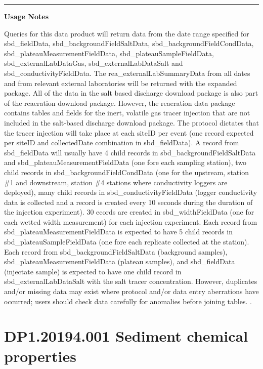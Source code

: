 \documentclass[]{article}
\begin{document}
\begin{center}\rule{0.5\linewidth}{\linethickness}\end{center}

\textbf{Usage Notes}

Queries for this data product will return data from the date range
specified for sbd\_fieldData, sbd\_backgroundFieldSaltData,
sbd\_backgroundFieldCondData, sbd\_plateauMeasurementFieldData,
sbd\_plateauSampleFieldData, sbd\_externalLabDataGas,
sbd\_externalLabDataSalt and sbd\_conductivityFieldData. The
rea\_externalLabSummaryData from all dates and from relevant external
laboratories will be returned with the expanded package. All of the data
in the salt based discharge download package is also part of the
reaeration download package. However, the reaeration data package
contains tables and fields for the inert, volatile gas tracer injection
that are not included in the salt-based discharge download package. The
protocol dictates that the tracer injection will take place at each
siteID per event (one record expected per siteID and collectedDate
combination in sbd\_fieldData). A record from sbd\_fieldData will
usually have 4 child records in sbd\_backgroundFieldSaltData and
sbd\_plateauMeasurementFieldData (one fore each sampling station), two
child records in sbd\_backgroundFieldCondData (one for the upstream,
station \#1 and downstream, station \#4 stations where conductivity
loggers are deployed), many child records in sbd\_conductivityFieldData
(logger conductivity data is collected and a record is created every 10
seconds during the duration of the injection experiment). 30 ecords are
created in sbd\_widthFieldData (one for each wetted width measurement)
for each injection experiment. Each record from
sbd\_plateauMeasurementFieldData is expected to have 5 child records in
sbd\_plateauSampleFieldData (one fore each replicate collected at the
station). Each record from sbd\_backgroundFieldSaltData (background
samples), sbd\_plateauMeasurementFieldData (plateau samples), and
sbd\_fieldData (injectate sample) is expected to have one child record
in sbd\_externalLabDataSalt with the salt tracer concentration. However,
duplicates and/or missing data may exist where protocol and/or data
entry aberrations have occurred; users should check data carefully for
anomalies before joining tables. \newpage
.

\section{DP1.20194.001 Sediment chemical
properties}\label{dp1.20194.001-sediment-chemical-properties}
\end{document}
